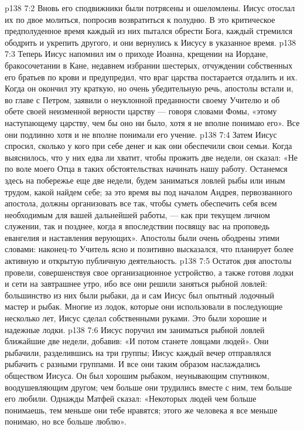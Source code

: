 \vs p138 7:2 Вновь его сподвижники были потрясены и ошеломлены. Иисус отослал их по двое молиться, попросив возвратиться к полудню. В это критическое предполуденное время каждый из них пытался обрести Бога, каждый стремился ободрить и укрепить другого, и они вернулись к Иисусу в указанное время.
\vs p138 7:3 Теперь Иисус напомнил им о приходе Иоанна, крещении на Иордане, бракосочетании в Кане, недавнем избрании шестерых, отчуждении собственных его братьев по крови и предупредил, что враг царства постарается отдалить и их. Когда он окончил эту краткую, но очень убедительную речь, апостолы встали и, во главе с Петром, заявили о неуклонной преданности своему Учителю и об обете своей неизменной верности царству --- говоря словами Фомы, «этому наступающему царству, чем бы оно ни было, хотя я не вполне понимаю его». Все они подлинно  хотя и не вполне понимали его учение.
\vs p138 7:4 Затем Иисус спросил, сколько у кого при себе денег и как они обеспечили свои семьи. Когда выяснилось, что у них едва ли хватит, чтобы прожить две недели, он сказал: «Не по воле моего Отца в таких обстоятельствах начинать нашу работу. Останемся здесь на побережье еще две недели, будем заниматься ловлей рыбы или иным трудом, какой найдем себе; за это время вы под началом Андрея, первозванного апостола, должны организовать все так, чтобы суметь обеспечить себя всем необходимым для вашей дальнейшей работы, --- как при текущем личном служении, так и позднее, когда я впоследствии посвящу вас на проповедь евангелия и наставления верующих». Апостолы были очень ободрены этими словами: наконец\hyp{}то Учитель ясно и позитивно высказался, что планирует более активную и открытую публичную деятельность.
\vs p138 7:5 Остаток дня апостолы провели, совершенствуя свое организационное устройство, а также готовя лодки и сети на завтрашнее утро, ибо все они решили заняться рыбной ловлей: большинство из них были рыбаки, да и сам Иисус был опытный лодочный мастер и рыбак. Многие из лодок, которые они использовали в последующие несколько лет, Иисус сделал собственными руками. Это были хорошие и надежные лодки.
\vs p138 7:6 Иисус поручил им заниматься рыбной ловлей ближайшие две недели, добавив: «И потом станете ловцами людей». Они рыбачили, разделившись на три группы; Иисус каждый вечер отправлялся рыбачить с разными группами. И все они таким образом наслаждались обществом Иисуса. Он был хорошим рыбаком, неунывающим спутником, воодушевляющим другом; чем больше они трудились вместе с ним, тем больше его любили. Однажды Матфей сказал: «Некоторых людей чем больше понимаешь, тем меньше они тебе нравятся; этого же человека я все меньше понимаю, но все больше люблю».
